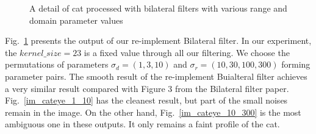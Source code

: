 \documentclass[12pt]{article}
\begin{document}
\begin{figure}[H]
  \quad
  \quad
  \quad
\caption{A detail of cat processed with bilateral filters with various range and domain parameter values}
\label{im_cateye}
\end{figure}

Fig.~\ref{im_cateye} presents the output of our re-implement Bilateral filter. 
In our experiment, the $kernel\_size = 23$ is a fixed value through all our filtering. 
We choose the permutations of parameters $\sigma_d = (1, 3, 10)$ and $\sigma_r = (10, 30, 100, 300)$ forming parameter pairs. 
The smooth result of the re-implement Buialteral filter achieves a very similar result compared with Figure 3 from the Bilateral filter paper.
Fig.~\ref{im_cateye_1_10} has the cleanest result, but part of the small noises remain in the image. 
On the other hand, Fig.~\ref{im_cateye_10_300} is the most ambiguous one in these outputs.
It only remains a faint profile of the cat. 
\end{document}
